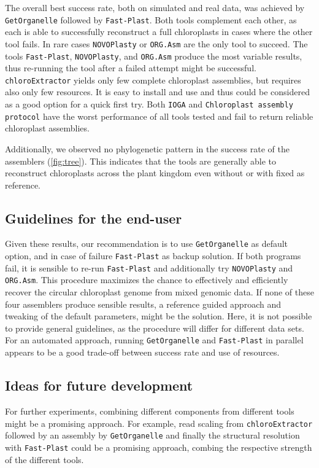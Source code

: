 \documentclass{bmcart}
\newcounter{todocounter}
\newcommand{\ak}[1]
{\stepcounter{todocounter}
 \todo[color=green!40,author=Arthur]{\thetodocounter: #1}
 }
\newcommand{\formatprogramnames}[1]{\texttt{#1}}
\newcommand{\ce}{\formatprogramnames{chloroExtractor}}
\newcommand{\oa}{\formatprogramnames{ORG.Asm}}
\newcommand{\fp}{\formatprogramnames{Fast-Plast}}
\newcommand{\ioga}{\formatprogramnames{IOGA}}
\newcommand{\np}{\formatprogramnames{NOVOPlasty}}
\newcommand{\go}{\formatprogramnames{GetOrganelle}}
\newcommand{\cassp}{\formatprogramnames{Chloroplast assembly protocol}}
\begin{document}
The overall best success rate, both on simulated and real data, was achieved by \go{} followed by \fp{}.
Both tools complement each other, as each is able to successfully reconstruct a full chloroplasts in cases where the other tool fails. 
In rare cases \np{} or \oa{} are the only tool to succeed.
The tools \fp{}, \np{}, and \oa{} produce the most variable results, thus re-running the tool after a failed attempt might be successful.
\ce{} yields only few complete chloroplast assemblies, but requires also only few resources.
It is easy to install and use and thus could be considered as a good option for a quick first try.
Both \ioga{} and \cassp{} have the worst performance of all tools tested and fail to return reliable chloroplast assemblies.

Additionally, we observed no phylogenetic pattern in the success rate of the assemblers (\cref{fig:tree}).
This indicates that the tools are generally able to reconstruct chloroplasts across the plant kingdom even without or with fixed  as reference.

\subsection*{Guidelines for the end-user}
Given these results, our recommendation is to use \go{} as default option, and in case of failure \fp{} as backup solution.
If both programs fail, it is sensible to re-run \fp{} and additionally try \np{} and \oa{}.
This procedure maximizes the chance to effectively and efficiently recover the circular chloroplast genome from mixed genomic data.
If none of these four assemblers produce sensible results, a reference guided approach and tweaking of the default parameters, might be the solution.
Here, it is not possible to provide general guidelines, as the procedure will differ for different data sets.
For an automated approach, running \go{} and \fp{} in parallel appears to be a good trade-off between success rate and use of resources.

\subsection*{Ideas for future development}
For further experiments, combining different components from different tools might be a promising approach.
For example, read scaling from \ce{} followed by an assembly by \go{} and finally the structural resolution with \fp{} could be a promising approach, combing the respective strength of the different tools.
\end{document}
